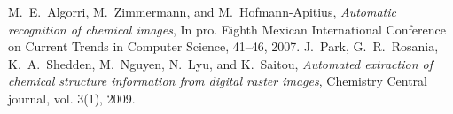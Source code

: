 \documentclass[conference]{IEEEtran}
\begin{document}
\begin{thebibliography}{1}
M.~E.~Algorri, M.~Zimmermann, and M.~Hofmann-Apitius,
\emph{Automatic recognition of chemical images},
In pro. Eighth Mexican International Conference on Current Trends in Computer Science, 41--46, 2007.
J.~Park, G.~R.~Rosania, K.~A.~Shedden, M.~Nguyen, N.~Lyu, and K.~Saitou,
\emph{Automated extraction of chemical structure information from digital raster images}, Chemistry Central journal, vol. 3(1), 2009.
%
% 
%
% 
% 
% 
%
%
%
%
%







\end{thebibliography}




\end{document}

